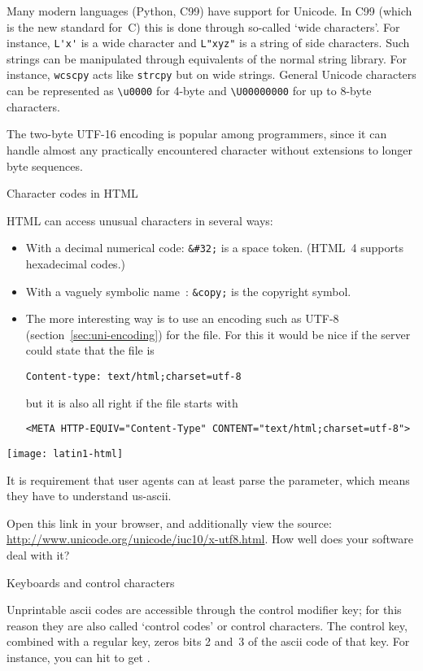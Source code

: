 Many modern languages (Python, C99) have support for Unicode. In C99
(which is the new standard for~C) this is done through so-called `wide
characters'. For instance, \verb+L'x'+ is a wide character and
\verb+L"xyz"+ is a string of side characters. Such strings can be
manipulated through equivalents of the normal string library. For
instance, \verb+wcscpy+ acts like \verb+strcpy+ but on wide strings.
General Unicode characters can be represented as \verb+\u0000+ for
4-byte and \verb+\U00000000+ for up to 8-byte characters.

The two-byte UTF-16 encoding is popular among programmers, since it
can handle almost any practically encountered character without
extensions to longer byte sequences.

 {Character codes in HTML}

HTML can access unusual characters in several ways:
\begin{itemize}
\item With a decimal numerical code: \verb+&#32;+ is a space
  token. (HTML~4 supports hexadecimal codes.)
\item With a vaguely symbolic name~\cite{html-names,html-chars}:
  \verb+&copy;+ is the copyright symbol.
\item The more interesting way is to use an encoding such as UTF-8
  (section~\ref{sec:uni-encoding}) for the file. For this it would be
  nice if the server could state that the file is
\begin{verbatim}
Content-type: text/html;charset=utf-8
\end{verbatim}
  but it is also all right if the file starts with
\begin{verbatim}
<META HTTP-EQUIV="Content-Type" CONTENT="text/html;charset=utf-8">
\end{verbatim}
\end{itemize}

\texttt{[image: latin1-html]}

It is requirement that user agents can at least parse the 
parameter, which means they have to understand us-ascii.

Open this link in your browser, and additionally view the source:
\url{http://www.unicode.org/unicode/iuc10/x-utf8.html}. How well does
your software deal with it?


 {Keyboards and control characters}

Unprintable ascii codes are accessible through the control modifier
key; for this reason they are also called `control codes' or control characters. The control key,
combined with a regular key, zeros bits 2 and~3 of the ascii code of
that key. For instance, you can hit \n{Ctrl-[} to get
.

